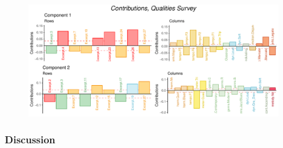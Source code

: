 \documentclass[
  english,
  man,floatsintext]{apa6}
\begin{document}
\begin{figure}

{\centering \includegraphics{Music-Descriptor-Space_files/figure-latex/contributionsQ-1} 

}

\caption{ }\label{fig:contributionsQ}
\end{figure}

\hypertarget{discussion}{%
\subsubsection{Discussion}\label{discussion}}
\end{document}

